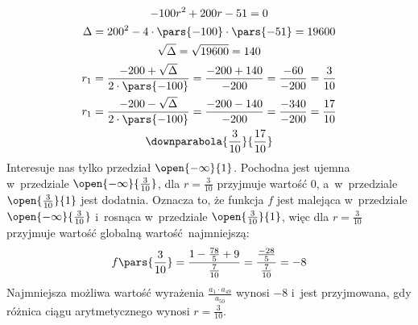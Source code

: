 \begin{gather*}
    -100r^2 + 200r - 51 = 0\\
    \Delta
        = 200^2 - 4 \cdot \pars{-100} \cdot \pars{-51}
        = 19600\\
    \sqrt{\Delta} = \sqrt{19600} = 140\\
    r_1
        = \frac{-200 + \sqrt{\Delta}}{2 \cdot \pars{-100}}
        = \frac{-200 + 140}{-200}
        = \frac{-60}{-200}
        = \frac{3}{10}\\
    r_1
        = \frac{-200 - \sqrt{\Delta}}{2 \cdot \pars{-100}}
        = \frac{-200 - 140}{-200}
        = \frac{-340}{-200}
        = \frac{17}{10}\\
    \downparabola{\frac{3}{10}}{\frac{17}{10}}
\end{gather*}
Interesuje nas tylko przedział \(\open{-\infty}{1}\). Pochodna jest ujemna w~przedziale \(\open{-\infty}{\frac{3}{10}}\), dla \(r = \frac{3}{10}\) przyjmuje wartość \(0\), a~w~przedziale \(\open{\frac{3}{10}}{1}\) jest dodatnia. Oznacza to, że funkcja \(f\) jest malejąca w~przedziale \(\open{-\infty}{\frac{3}{10}}\) i~rosnąca w~przedziale \(\open{\frac{3}{10}}{1}\), więc dla \(r = \frac{3}{10}\) przyjmuje wartość globalną wartość najmniejszą:
\begin{equation*}
    f\pars{\frac{3}{10}}
        = \frac{1 - \frac{78}{5} + 9}{\frac{7}{10}}
        = \frac{\frac{-28}{5}}{\frac{7}{10}}
        = -8
\end{equation*}
Najmniejsza możliwa wartość wyrażenia \(\frac{a_1 \cdot a_{49}}{a_{50}}\) wynosi \(-8\) i~jest przyjmowana, gdy różnica ciągu arytmetycznego wynosi \(r = \frac{3}{10}\).
